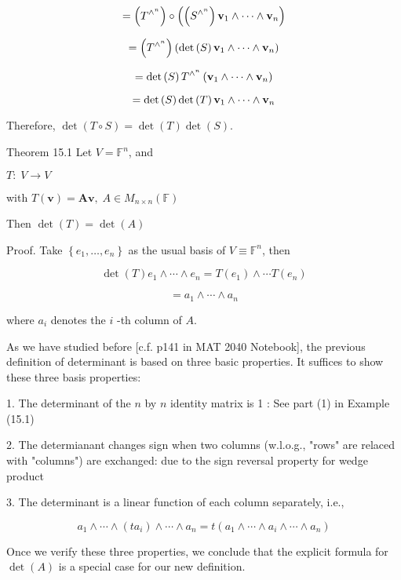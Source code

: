 \documentclass[11pt]{article}
\begin{document}
\[
= \left( {T}^{{ \land  }^n}\right)  \circ  \left( {\left( {S}^{{ \land  }^n}\right) {\bf v}_1 \land  \cdots  \land  {\bf v}_n}\right)
\]

\[
= \left( {T}^{{ \land  }^n}\right) \left( {\det \left( S\right) {\bf v}_1 \land  \cdots  \land  {\bf v}_n}\right)
\]

\[
= \det \left( S\right) {T}^{{ \land  }^n}\left( {{\bf v}_1 \land  \cdots  \land  {\bf v}_n}\right)
\]

\[
= \det \left( S\right) \det \left( T\right) {\bf v}_1 \land  \cdots  \land  {\bf v}_n
\]

Therefore, \(\det \left( {T \circ  S}\right)  = \det \left( T\right) \det \left( S\right)\).

Theorem 15.1 Let \(V = {\mathbb{F}}^n\), and

\(T : \;V \rightarrow  V\)

with \(T\left( \mathbf{v}\right)  = \mathbf{{Av}},\;A \in  {M}_{n \times  n}\left( \mathbb{F}\right)\)

Then \(\det \left( T\right)  = \det \left( A\right)\)

Proof. Take \(\left\{  {{e}_1,\ldots ,{e}_n}\right\}\) as the usual basis of \(V \equiv  {\mathbb{F}}^n\), then

\[
\det \left( T\right) {e}_1 \land  \cdots  \land  {e}_n = T\left( {e}_1\right)  \land  \cdots T\left( {e}_n\right)
\]

\[
= {a}_1 \land  \cdots  \land  {a}_n
\]

where \({a}_{i}\) denotes the \(i\) -th column of \(A\).

As we have studied before [c.f. p141 in MAT 2040 Notebook], the previous definition of determinant is based on three basic properties. It suffices to show these three basis properties:

1. The determinant of the \(n\) by \(n\) identity matrix is 1 : See part (1) in Example (15.1)

2. The determianant changes sign when two columns (w.l.o.g., "rows" are relaced with "columns") are exchanged: due to the sign reversal property for wedge product

3. The determinant is a linear function of each column separately, i.e.,

\[
{a}_1 \land  \cdots  \land  \left( {t{a}_{i}}\right)  \land  \cdots  \land  {a}_n = t\left( {{a}_1 \land  \cdots  \land  {a}_{i} \land  \cdots  \land  {a}_n}\right)
\]

Once we verify these three properties, we conclude that the explicit formula for \(\det \left( A\right)\) is a special case for our new definition.
\end{document}
